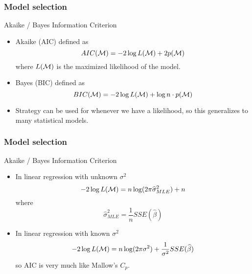 \documentclass[handout]{beamer}
\begin{document}

   \begin{frame} \frametitle{Model selection}

   \begin{block}
   {Akaike / Bayes Information Criterion}

   \begin{itemize}

   \item Akaike (AIC) defined as
   $$
   AIC({\cal M}) = - 2 \log L({\cal M}) + 2 p({\cal M})
   $$
   where $L({\cal M})$ is the maximized likelihood of the model.

   \item Bayes (BIC) defined as
   $$
   BIC({\cal M}) = - 2 \log L({\cal M}) + \log n \cdot p({\cal M})
   $$

   \item Strategy can be used for whenever we have a likelihood, so
   this generalizes to many statistical models.

   \end{itemize}
   \end{block}
   \end{frame}


   \begin{frame} \frametitle{Model selection}

   \begin{block}
   {Akaike / Bayes Information Criterion}

   \begin{itemize}


   \item In linear regression with unknown $\sigma^2$
   $$
   -2 \log L({\cal M}) = n \log(2\pi \widehat{\sigma}^2_{MLE}) + n
   $$
   where
   $$
   \widehat{\sigma}^2_{MLE} = \frac{1}{n} SSE(\widehat{\beta})
   $$


   \item In linear regression with known $\sigma^2$
   $$
   -2 \log L({\cal M}) = n \log(2\pi \sigma^2) + \frac{1}{\sigma^2} SSE(\widehat{\beta})
   $$
   so AIC is very much like Mallow's $C_p$.

   \end{itemize}


   \end{block}
   \end{frame}
\end{document}
